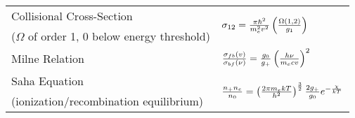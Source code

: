 \documentclass[10pt]{article}
\begin{document}
\begin{table}[h!]
\begin{tabular}{|l|l|}
\hline
Collisional Cross-Section & 
\multirow{2}{*}{$\sigma_{12}=
{\pi \hbar^2\over m_e^2v^2}\left({\Omega(1,2)\over g_1}\right)$}\\
($\Omega$ of order 1, 0 below energy threshold) & \\

\hline
Milne Relation &
${\sigma_{fb}(v)\over\sigma_{bf}(\nu)}={g_0\over g_+}\left({h\nu\over m_ecv}
\right)^2$ \\

\hline
Saha Equation & 
\multirow{2}{*}{${n_+n_e\over n_0}=\left(
{2\pi m_ekT\over h^2}\right)^\frac32{2g_+\over g_0} e^{-{\chi\over kT}}$} \\
(ionization/recombination equilibrium) & \\

\hline
\end{tabular}\end{table}
\pagebreak
\end{document}
